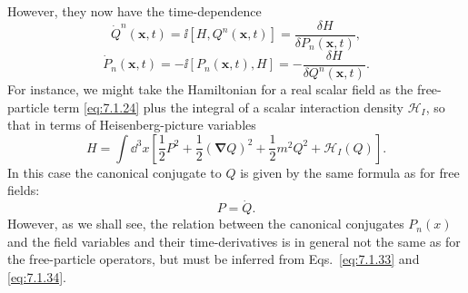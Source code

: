 However, they now have the time-dependence
\begin{equation}
\dot Q^n(\mathbf{x},t)=\ii[H,Q^n(\mathbf{x},t)]
=\frac{\delta H}{\delta P_n(\mathbf{x},t)},
\tag{7.1.33}\label{eq:7.1.33}
\end{equation}
\begin{equation}
\dot P_n(\mathbf{x},t)=-\ii[P_n(\mathbf{x},t),H]
=-\frac{\delta H}{\delta Q^n(\mathbf{x},t)}.
\tag{7.1.34}\label{eq:7.1.34}
\end{equation}
For instance, we might take the Hamiltonian for a real scalar field as the
free-particle term \eqref{eq:7.1.24} plus the integral of a scalar interaction density
$\mathcal{H}_I$, so that in terms of Heisenberg-picture variables
\begin{equation}
H=\int \dd^3x\left[\frac12P^2+\frac12(\boldsymbol{\nabla}Q)^2
+\frac12m^2Q^2+\mathcal{H}_I(Q)\right].
\tag{7.1.35}\label{eq:7.1.35}
\end{equation}
In this case the canonical conjugate to $Q$ is given by the same formula as
for free fields:
\begin{equation}
P=\dot Q.
\tag{7.1.36}\label{eq:7.1.36}
\end{equation}
However, as we shall see, the relation between the canonical conjugates
$P_n(x)$ and the field variables and their time-derivatives is in general not
the same as for the free-particle operators, but must be inferred from
Eqs.~\eqref{eq:7.1.33} and \eqref{eq:7.1.34}.
